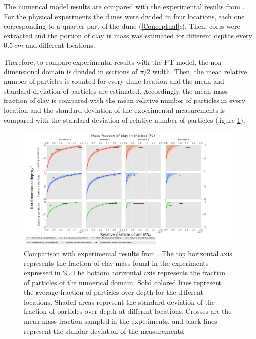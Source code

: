 \documentclass[draft,linenumbers]{agujournal2018}
\begin{document}
The numerical model results are compared with the experimental results from \citet{Fox2014,Fox2018}. For the physical experiments the dunes were divided in four locations, each one corresponding to a quarter part of the dune (\ref{Conceptual}c). Then, cores were extracted and the portion of clay in mass was estimated for different depths every $0.5 \ cm$ and different locations. 

Therefore, to compare experimental results with the PT model, the non-dimensional domain is divided in sections of $\pi/2$ width. Then, the mean relative number of particles is counted for every dune location and the mean and standard deviation of particles are estimated. Accordingly, the mean mass fraction of clay is compared with the mean relative number of particles in every location and the standard deviation of the experimental measurements is compared with the standard deviation of relative number of particles (figure \ref{Comparison}).  

\begin{figure}
\centering
\includegraphics[trim=0.2cm 0.2cm 0.2cm 0.2cm, width=65pc]
{190131_Comparing.pdf}
\caption{Comparison with experimental results from \citep{Fox2018}. The top horizontal axis represents the fraction of clay mass found in the experiments expressed in $\%$. The bottom horizontal axis represents the fraction of particles of the numerical domain. Solid colored lines represent the average fraction of particles over depth for the different locations. Shaded areas represent the standard deviation of the fraction of particles over depth at different locations. Crosses are the mean mass fraction sampled in the experiments, and black lines represent the standar deviation of the measurements.}
\label{Comparison}
\end{figure}
\end{document}
